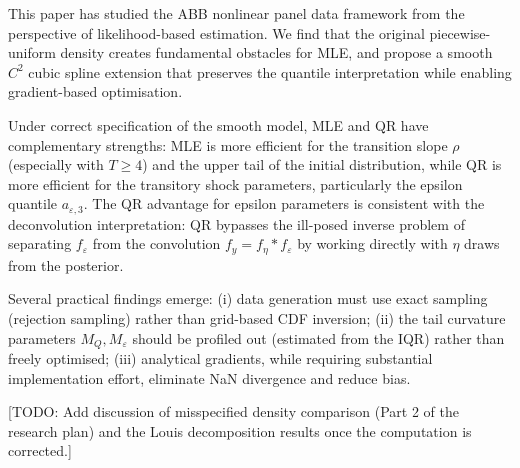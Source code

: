 \documentclass[12pt]{article}
\begin{document}
This paper has studied the ABB nonlinear panel data framework from the
perspective of likelihood-based estimation.
We find that the original piecewise-uniform density creates fundamental
obstacles for MLE, and propose a smooth $C^2$ cubic spline extension that
preserves the quantile interpretation while enabling gradient-based optimisation.

Under correct specification of the smooth model, MLE and QR have complementary
strengths:
MLE is more efficient for the transition slope $\rho$ (especially with $T \geq 4$)
and the upper tail of the initial distribution, while QR is more efficient for
the transitory shock parameters, particularly the epsilon quantile
$a_{\varepsilon,3}$.
The QR advantage for epsilon parameters is consistent with the deconvolution
interpretation: QR bypasses the ill-posed inverse problem of separating
$f_\varepsilon$ from the convolution $f_y = f_\eta * f_\varepsilon$ by
working directly with $\eta$ draws from the posterior.

Several practical findings emerge:
(i) data generation must use exact sampling (rejection sampling) rather than
grid-based CDF inversion;
(ii) the tail curvature parameters $M_Q, M_\varepsilon$ should be profiled
out (estimated from the IQR) rather than freely optimised;
(iii) analytical gradients, while requiring substantial implementation effort,
eliminate NaN divergence and reduce bias.

\textcolor{myred}{[TODO: Add discussion of misspecified density comparison
(Part 2 of the research plan) and the Louis decomposition results once the
computation is corrected.]}
\end{document}
